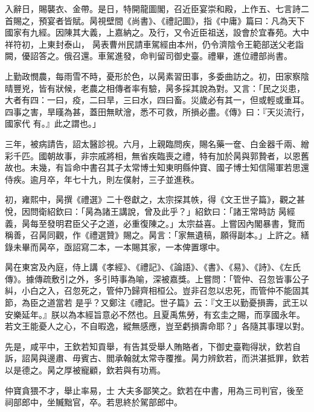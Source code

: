 \begin{pinyinscope}
 入辭日，賜襲衣、金帶。是日，特開龍圖閣，召近臣宴崇和殿，上作五、七言詩二首賜之，預宴者皆賦。昺視壁間《尚書》、《禮記圖》，指《中庸》篇曰：凡為天下國家有九經。因陳其大義，上嘉納之。及行，又令近臣祖送，設會於宜春苑。大中祥符初，上東封泰山，
 昺表曹州民請車駕經由本州，仍令濟陰令王範部送父老詣闕，優詔答之。俄召還。車駕進發，命判留司御史臺。禮畢，進位禮部尚書。



 上勤政憫農，每雨雪不時，憂形於色，以昺素習田事，多委曲訪之。初，田家察陰晴豐兇，皆有狀候，老農之相傳者率有驗，昺多採其說為對。又言：「民之災患，大者有四：一曰，疫，二曰旱，三曰水，四曰畜。災歲必有其一，但或輕或重耳。四事之害，旱暵為甚，蓋田無畎澮，悉不可救，所損必盡。《傳》曰：『天災流行，國家代
 有。』此之謂也。」



 三年，被病請告，詔太醫診視。六月，上親臨問疾，賜名藥一奩、白金器千兩、繒彩千匹。國朝故事，非宗戚將相，無省疾臨喪之禮，特有加於昺與郭贄者，以恩舊故也。未幾，有旨命中書召其子太常博士知東明縣仲寶、國子博士知信陽軍若思還侍疾。逾月卒，年七十九，則左僕射，三子並進秩。



 初，雍熙中，昺撰《禮選》二十卷獻之，太宗探其帙，得《文王世子篇》，觀之甚悅，因問衛紹欽曰：「昺為諸王講說，曾及此乎？」紹欽曰：「諸王常時訪
 昺經義，昺每至發明君臣父子之道，必重復陳之。」太宗益喜。上嘗因內閣暴書，覽而稱善，召昺同觀，作《禮選贊》賜之。昺言：「家無遺稿，願得副本。」上許之。繕錄未畢而昺卒，亟詔寫二本，一本賜其家，一本俾置塚中。



 昺在東宮及內庭，侍上講《孝經》、《禮記》、《論語》、《書》、《易》、《詩》、《左氏傳》。據傳疏敷引之外，多引時事為喻，深被嘉獎。上嘗問：「管仲、召忽皆事公子糾，小白之入，召忽死之，管仲乃歸齊相桓公。豈非召忽以忠死，而管仲不能固其節，為臣之道當若
 是乎？又鄭注《禮記。世子篇》云：『文王以勤憂損壽，武王以安樂延年。』朕以為本經旨意必不然也。且夏禹焦勞，有玄圭之賜，而享國永年。若文王能憂人之心，不自暇逸，縱無感應，豈至虧損壽命耶？」各隨其事理以對。



 先是，咸平中，王欽若知貢舉，有告其受舉人賄賂者，下御史臺鞫得狀，欽若自訴，詔昺與邊肅、毋賓古、閻承翰就太常寺覆推。昺力辨欽若，而洪湛抵罪，欽若以是德之。昺之厚被寵顧，欽若與有功焉。



 仲寶貪猥不才，舉止率易，士
 大夫多鄙笑之。欽若在中書，用為三司判官，後至祠部郎中，坐贓黜官，卒。若思終於駕部郎中。




\end{pinyinscope}
